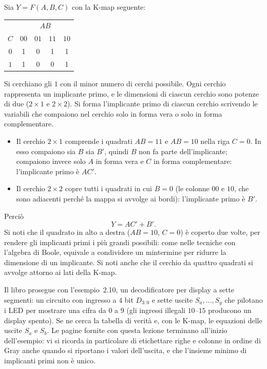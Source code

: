 \documentclass[11pt,a4paper]{article}
\begin{document}
\begin{esempio}
Sia $Y = F(A,B,C)$ con la K-map seguente:
\begin{center}
\begin{tabular}{c|cccc}
 & \multicolumn{4}{c}{$AB$}\\
$C$ & $00$ & $01$ & $11$ & $10$ \\
\midrule
$0$ & 1 & 0 & 1 & 1 \\
$1$ & 1 & 0 & 0 & 1 \\
\end{tabular}
\end{center}
Si cerchiano gli $1$ con il minor numero di cerchi possibile. Ogni cerchio rappresenta un implicante primo, e le dimensioni di ciascun cerchio sono potenze di due ($2 \times 1$ e $2 \times 2$). Si forma l'implicante primo di ciascun cerchio scrivendo le variabili che compaiono nel cerchio solo in forma vera o solo in forma complementare.

\begin{itemize}
    \item Il cerchio $2 \times 1$ comprende i quadrati $AB = 11$ e $AB = 10$ nella riga $C = 0$. In esso compaiono sia $B$ sia $B'$, quindi $B$ non fa parte dell'implicante; compaiono invece solo $A$ in forma vera e $C$ in forma complementare: l'implicante primo è $AC'$.
    \item Il cerchio $2 \times 2$ copre tutti i quadrati in cui $B = 0$ (le colonne $00$ e $10$, che sono adiacenti perché la mappa si avvolge ai bordi): l'implicante primo è $B'$.
\end{itemize}
Perciò
\[
Y = AC' + B'.
\]
Si noti che il quadrato in alto a destra ($AB = 10$, $C = 0$) è coperto due volte, per rendere gli implicanti primi i più grandi possibili: come nelle tecniche con l'algebra di Boole, equivale a condividere un mintermine per ridurre la dimensione di un implicante. Si noti anche che il cerchio da quattro quadrati si avvolge attorno ai lati della K-map.
\end{esempio}

\begin{osservazione}
Il libro prosegue con l'esempio~2.10, un decodificatore per display a sette segmenti: un circuito con ingresso a $4$ bit $D_{3:0}$ e sette uscite $S_a, \dots, S_g$ che pilotano i LED per mostrare una cifra da $0$ a $9$ (gli ingressi illegali $10$--$15$ producono un display spento). Se ne cerca la tabella di verità e, con le K-map, le equazioni delle uscite $S_a$ e $S_b$. Le pagine fornite con questa lezione terminano all'inizio dell'esempio: vi si ricorda in particolare di etichettare righe e colonne in ordine di Gray anche quando si riportano i valori dell'uscita, e che l'insieme minimo di implicanti primi non è unico.
\end{osservazione}
\end{document}
